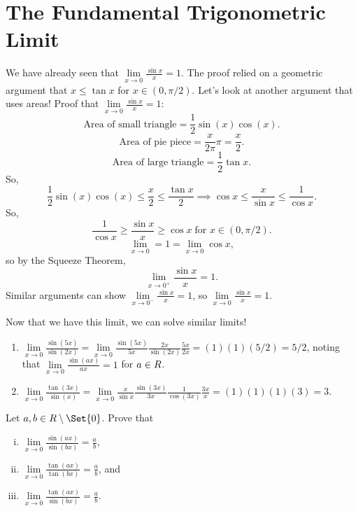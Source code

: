 \section{The Fundamental Trigonometric Limit}
We have already seen that $ \lim\limits_{{x} \to {0}}\frac{\sin x}{x}=1 $.
The proof relied on a geometric argument that $ x\le \tan x $ for $ x\in(0,\pi/2) $.
Let's look at another argument that uses areas! Proof that $ \lim\limits_{{x} \to {0}}\frac{\sin x}{x}=1 $:
\[ \text{Area of small triangle}=\frac{1}{2}\sin(x)\cos(x). \]
\[ \text{Area of pie piece}=\frac{x}{2\pi}\pi=\frac{x}{2}. \]
\[ \text{Area of large triangle}=\frac{1}{2}\tan x. \]
So,
\[ \frac{1}{2}\sin(x)\cos(x)\le \frac{x}{2}\le \frac{\tan x}{2}\implies \cos x\le \frac{x}{\sin x}\le \frac{1}{\cos x}. \]
So,
\[ \frac{1}{\cos x}\ge \frac{\sin x}{x}\ge \cos x\; \text{for }x\in(0,\pi/2). \]
\[ \lim\limits_{{x} \to {0}}=1=\lim\limits_{{x} \to {0}}\cos x, \]
so by the Squeeze Theorem,
\[ \lim\limits_{{x} \to {0^+}}\frac{\sin x}{x}=1. \]
Similar arguments can show $ \lim\limits_{{x} \to {0^-}}\frac{\sin x}{x}=1 $,
so $ \lim\limits_{{x} \to {0}}\frac{\sin x}{x}=1 $.

Now that we have this limit, we can solve similar limits!
\begin{Example}{}{}
    \begin{enumerate}[(1)]
        \item $\displaystyle \lim\limits_{{x} \to {0}}\frac{\sin(5x)}{\sin(2x)}
                  =\lim\limits_{{x} \to {0}}\frac{\sin(5x)}{5x}\frac{2x}{\sin(2x)}\frac{5x}{2x}=(1)(1)(5/2)=5/2 $,
              noting that $ \lim\limits_{{x} \to {0}}\frac{\sin(ax)}{ax}=1 $ for $ a\in\relax{R} $.
        \item $ \displaystyle \lim\limits_{{x} \to {0}}\frac{\tan(3x)}{\sin(x)}
                  =\lim\limits_{{x} \to {0}}\frac{x}{\sin x}\frac{\sin(3x)}{3x}\frac{1}{\cos(3x)}\frac{3x}{x}=(1)(1)(1)(3)=3 $.
    \end{enumerate}
\end{Example}
\begin{Exercise}{}{}
    Let $ a,b\in\R\setminus \Set{0} $. Prove that
    \begin{enumerate}[(i)]
        \item $ \displaystyle \lim\limits_{{x} \to {0}}\frac{\sin(ax)}{\sin(bx)}=\frac{a}{b} $,
        \item $ \displaystyle \lim\limits_{{x} \to {0}}\frac{\tan(ax)}{\tan(bx)}=\frac{a}{b} $, and
        \item $ \displaystyle \lim\limits_{{x} \to {0}}\frac{\tan(ax)}{\sin(bx)}=\frac{a}{b} $.
    \end{enumerate}
\end{Exercise}
